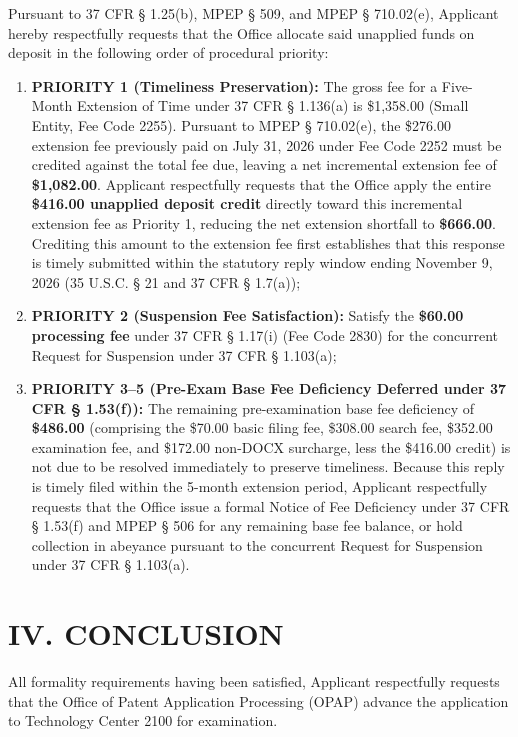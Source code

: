 \documentclass[11pt,letterpaper]{article}
\begin{document}
Pursuant to 37 CFR \S{} 1.25(b), MPEP \S{} 509, and MPEP \S{} 710.02(e), Applicant hereby respectfully requests that the Office allocate said unapplied funds on deposit in the following order of procedural priority:
\begin{enumerate}[leftmargin=*]
    \item \textbf{PRIORITY 1 (Timeliness Preservation):} The gross fee for a Five-Month Extension of Time under 37 CFR \S{} 1.136(a) is \$1,358.00 (Small Entity, Fee Code 2255). Pursuant to MPEP \S{} 710.02(e), the \$276.00 extension fee previously paid on July 31, 2026 under Fee Code 2252 must be credited against the total fee due, leaving a net incremental extension fee of \textbf{\$1,082.00}. Applicant respectfully requests that the Office apply the entire \textbf{\$416.00 unapplied deposit credit} directly toward this incremental extension fee as Priority 1, reducing the net extension shortfall to \textbf{\$666.00}. Crediting this amount to the extension fee first establishes that this response is timely submitted within the statutory reply window ending November 9, 2026 (35 U.S.C. \S{} 21 and 37 CFR \S{} 1.7(a));
    \item \textbf{PRIORITY 2 (Suspension Fee Satisfaction):} Satisfy the \textbf{\$60.00 processing fee} under 37 CFR \S{} 1.17(i) (Fee Code 2830) for the concurrent Request for Suspension under 37 CFR \S{} 1.103(a);
    \item \textbf{PRIORITY 3--5 (Pre-Exam Base Fee Deficiency Deferred under 37 CFR \S{} 1.53(f)):} The remaining pre-examination base fee deficiency of \textbf{\$486.00} (comprising the \$70.00 basic filing fee, \$308.00 search fee, \$352.00 examination fee, and \$172.00 non-DOCX surcharge, less the \$416.00 credit) is not due to be resolved immediately to preserve timeliness. Because this reply is timely filed within the 5-month extension period, Applicant respectfully requests that the Office issue a formal Notice of Fee Deficiency under 37 CFR \S{} 1.53(f) and MPEP \S{} 506 for any remaining base fee balance, or hold collection in abeyance pursuant to the concurrent Request for Suspension under 37 CFR \S{} 1.103(a).
\end{enumerate}

\section*{IV. CONCLUSION}

All formality requirements having been satisfied, Applicant respectfully requests that the Office of Patent Application Processing (OPAP) advance the application to Technology Center 2100 for examination.
\end{document}
